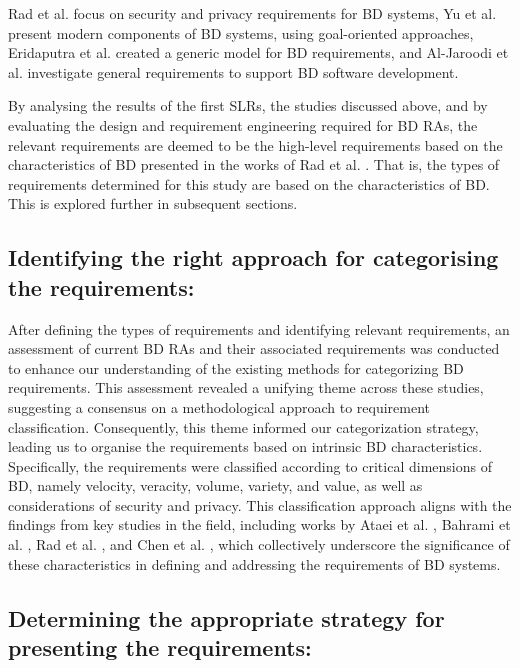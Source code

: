 \documentclass[preprint,12pt]{elsarticle}
\begin{document}
Rad et al. \cite{AtaeiSecurity} focus on security and privacy requirements for BD systems, Yu et al. \cite{yu2019components} present modern components of BD systems, using goal-oriented approaches, Eridaputra et al. \cite{eridaputra2014modeling} created a generic model for BD requirements, and Al-Jaroodi et al. \cite{al2016characteristics} investigate general requirements to support BD software development. 

By analysing the results of the first SLRs, the studies discussed above, and by evaluating the design and requirement engineering required for BD RAs, the relevant requirements are deemed to be the high-level requirements based on the characteristics of BD presented in the works of Rad et al. \cite{Rada2017}. That is, the types of requirements determined for this study are based on the characteristics of BD. This is explored further in subsequent sections.

\subsection{Identifying the right approach for categorising the requirements:}

After defining the types of requirements and identifying relevant requirements, an assessment of current BD RAs and their associated requirements was conducted to enhance our understanding of the existing methods for categorizing BD requirements. This assessment revealed a unifying theme across these studies, suggesting a consensus on a methodological approach to requirement classification. Consequently, this theme informed our categorization strategy, leading us to organise the requirements based on intrinsic BD characteristics. Specifically, the requirements were classified according to critical dimensions of BD, namely velocity, veracity, volume, variety, and value, as well as considerations of security and privacy. This classification approach aligns with the findings from key studies in the field, including works by Ataei et al. \cite{ataei2022state}, Bahrami et al. \cite{Bahrami2015}, Rad et al. \cite{rad2017big}, and Chen et al. \cite{chang2015nist}, which collectively underscore the significance of these characteristics in defining and addressing the requirements of BD systems.

\subsection{Determining the appropriate strategy for presenting the requirements:} 
\end{document}
